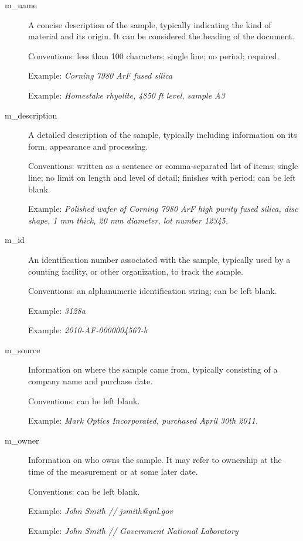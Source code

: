 \documentclass[11pt, letterpaper]{article}
\begin{document}
\begin{description}

  \item[m\_name] A concise description of the sample, typically indicating the kind of material and its origin. It can be considered the heading of the document. 
  
  Conventions: less than 100 characters; single line; no period; required.
  
  Example: \textit{Corning 7980 ArF fused silica}
  
  Example: \textit{Homestake rhyolite, 4850 ft level, sample A3}

\newpage

  \item[m\_description] A detailed description of the sample, typically including information on its form, appearance and processing. 
  
  Conventions: written as a sentence or comma-separated list of items; single line; no limit on length and level of detail; finishes with period; can be left blank.
  
  Example: \textit{Polished wafer of Corning 7980 ArF high purity fused silica, disc shape, 1 mm thick, 20 mm diameter, lot number 12345.}

  \item[m\_id] An identification number associated with the sample, typically used by a counting facility, or other organization, to track the sample.
  
  Conventions: an alphanumeric identification string; can be left blank.
  
  Example: \textit{3128a}

  Example: \textit{2010-AF-0000004567-b}

  \item[m\_source] Information on where the sample came from, typically consisting of a company name and purchase date.

  Conventions: can be left blank.
  
  Example: \textit{Mark Optics Incorporated, purchased April 30th 2011.} 


  \item[m\_owner] Information on who owns the sample. It may refer to ownership at the time of the measurement or at some later date.

  Conventions: can be left blank.
  
  Example: \textit{John Smith // jsmith@gnl.gov}   

  Example: \textit{John Smith // Government National Laboratory}   
  
\end{description}
\end{document}
